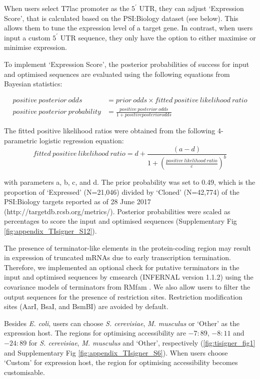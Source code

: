 When users select T7lac promoter as the $5^{\prime}$ UTR, they can adjust ‘Expression Score’, that is calculated based on the PSI:Biology dataset (see below). This allows them to tune the expression level of a target gene. In contrast, when users input a custom $5^{\prime}$ UTR sequence, they only have the option to either maximise or minimise expression.

To implement ‘Expression Score’, the posterior probabilities of success for input and optimised sequences are evaluated using the following equations from Bayesian statistics:

\begin{equation*}
\begin{split}
positive\ posterior\ odds &= prior\ odds \times fitted\ positive\ likelihood\ ratio \\
positive\ posterior\ probability &= \frac{ positive\ posterior\ odds}{1 + positive posterior odds}
\end{split}
\end{equation*}


The fitted positive likelihood ratios were obtained from the following 4-parametric logistic regression equation:
\begin{equation*}
 fitted\ positive\ likelihood\ ratio = d + \frac{(a-d)}{1+(\frac{positive\ likelihood\ ratio}{c})^b}
\end{equation*}

with parameters a, b, c, and d. The prior probability was set to 0.49, which is the proportion of ‘Expressed’ (N=21,046) divided by ‘Cloned’ (N=42,774) of the PSI:Biology targets reported as of 28 June 2017 (http://targetdb.rcsb.org/metrics/). Posterior probabilities were scaled as percentages to score the input and optimised sequences (Supplementary Fig \ref{fig:appendix_TIsigner_S12}).

The presence of terminator-like elements \cite{Chen2013-um} in the protein-coding region may result in expression of truncated mRNAs due to early transcription termination. Therefore, we implemented an optional check for putative terminators in the input and optimised sequences by cmsearch (INFERNAL version 1.1.2) \cite{Nawrocki2013-te} using the covariance models of terminators from RMfam \cite{Gardner2015-ui,Kalvari2018-un}. We also allow users to filter the output sequences for the presence of restriction sites. Restriction modification sites (AarI, BsaI, and BsmBI) are avoided by default.

Besides \textit{E. coli}, users can choose \textit{S. cerevisiae}, \textit{M. musculus} or ‘Other’ as the expression host. The regions for optimising accessibility are $−7:89$, $−8:11$ and $−24:89$ for \textit{S. cerevisiae}, \textit{M. musculus} and ‘Other’, respectively (\ref{fig:tisigner_fig1} and Supplementary Fig \ref{fig:appendix_TIsigner_S6}). When users choose ‘Custom’ for expression host, the region for optimising accessibility becomes customisable.

